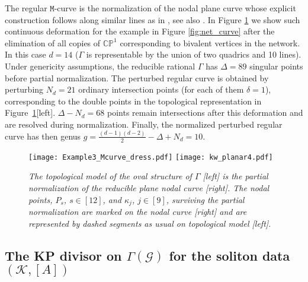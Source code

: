 \documentclass[11pt]{amsart}
\theoremstyle{plain}
\numberwithin{equation}{section}
\begin{document}
The regular ${\mathtt M}$-curve is the normalization of the nodal plane curve whose explicit construction follows along similar lines as in \cite{AG3}, see also \cite{Kr4}. In Figure \ref{fig:mcurveex} we show such continuous deformation for the example in Figure \ref{fig:net_curve} after the elimination of all copies of $\mathbb{CP}^1$ corresponding to bivalent vertices in the network. In this case $d=14$ ($\Gamma$ is representable by the union of two quadrics and 10 lines). Under genericity assumptions, the reducible rational $\Gamma$ has $\Delta=89$ singular points before partial normalization. The perturbed regular curve is obtained by perturbing $N_d=21$ ordinary intersection points (for each of them $\delta=1$), corresponding to the double points in the topological representation in Figure~\ref{fig:mcurveex}[left]. $\Delta-N_d = 68$ points remain intersections after this deformation and are resolved during normalization. Finally, the normalized perturbed regular curve has then genus $g=\frac{(d-1)(d-2)}{2}-\Delta+N_d=10$.

\begin{figure}%
  \centering
  {\texttt{[image: Example3\_Mcurve\_dress.pdf]}}
  \hfill
  {\texttt{[image: kw\_planar4.pdf]}}
  \caption{\small{\sl The topological model of the oval structure of $\Gamma$ [left] is the partial normalization of the reducible plane 
nodal curve [right].  The nodal points, $P_s$, $s\in [12]$, and $\kappa_j$, $j\in [9]$, surviving the partial normalization are marked on the nodal curve [right] and are represented by dashed segments as usual on topological model [left].}\label{fig:mcurveex} }
\end{figure}


\subsection{The KP divisor on $\Gamma(\mathcal G)$ for the soliton data $({\mathcal K}, [A])$}
\label{sec:KPdiv}
\end{document}
